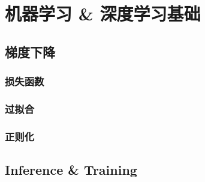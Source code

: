 \chapter{机器学习 \& 深度学习基础}\label{chap:deeplearning}

\begin{intro}

\end{intro}

\section{梯度下降}\label{sec:gradient-descent}

\subsection{损失函数}\label{loss-function}

\subsection{过拟合}\label{overfit}

\subsection{正则化}\label{regularized}


\section{Inference \& Training}\label{sec:inference-training}

\subsection{}\label{}


\endinput